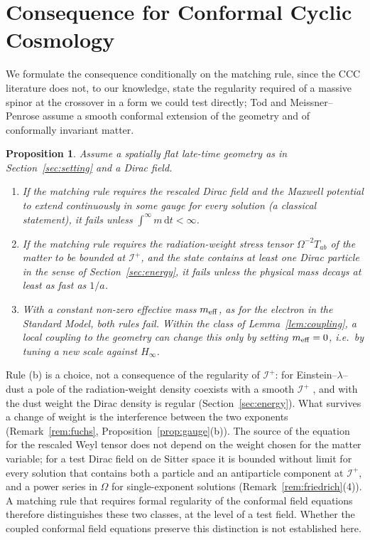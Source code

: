 \documentclass[11pt,a4paper]{article}
\newtheorem{proposition}{Proposition}
\theoremstyle{definition}
\newcommand{\scri}{\mathscr{I}^{+}}
\newcommand{\dd}{\mathrm{d}}
\begin{document}
\section{Consequence for Conformal Cyclic Cosmology}
\label{sec:ccc}

We formulate the consequence conditionally on the matching rule, since the CCC literature does not, to our knowledge, state the regularity required of a massive spinor at the crossover in a form we could test directly; Tod \cite{Tod2015} and Meissner--Penrose \cite{MeissnerPenrose2025} assume a smooth conformal extension of the geometry and of conformally invariant matter.

\begin{proposition}
\label{prop:ccc}
Assume a spatially flat late-time geometry as in Section~\ref{sec:setting} and a Dirac field.
\begin{enumerate}[label=(\alph*)]
\item If the matching rule requires the rescaled Dirac field and the Maxwell potential to extend continuously in some gauge for every solution (a classical statement), it fails unless $\int^{\infty}m\,\dd t<\infty$.
\item If the matching rule requires the radiation-weight stress tensor $\Omega^{-2}T_{ab}$ of the matter to be bounded at $\scri$, and the state contains at least one Dirac particle in the sense of Section~\ref{sec:energy}, it fails unless the physical mass decays at least as fast as $1/a$.
\item With a constant non-zero effective mass $m_{\rm eff}$, as for the electron in the Standard Model, both rules fail. Within the class of Lemma~\ref{lem:coupling}, a local coupling to the geometry can change this only by setting $m_{\rm eff}=0$, i.e.\ by tuning a new scale against $H_{\infty}$.
\end{enumerate}
\end{proposition}

Rule (b) is a choice, not a consequence of the regularity of $\scri$: for Einstein--$\lambda$--dust a pole of the radiation-weight density coexists with a smooth $\scri$ \cite{Friedrich2017}, and with the dust weight the Dirac density is regular (Section~\ref{sec:energy}). What survives a change of weight is the interference between the two exponents (Remark~\ref{rem:fuchs}, Proposition~\ref{prop:gauge}(b)). The source of the equation for the rescaled Weyl tensor does not depend on the weight chosen for the matter variable; for a test Dirac field on de Sitter space it is bounded without limit for every solution that contains both a particle and an antiparticle component at $\scri$, and a power series in $\Omega$ for single-exponent solutions (Remark~\ref{rem:friedrich}(4)). A matching rule that requires formal regularity of the conformal field equations therefore distinguishes these two classes, at the level of a test field. Whether the coupled conformal field equations preserve this distinction is not established here.
\end{document}
